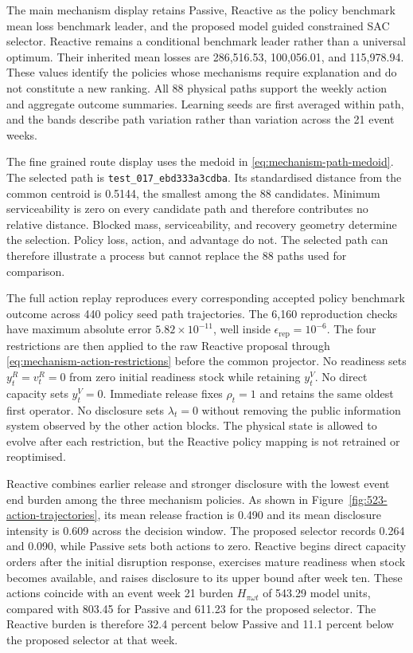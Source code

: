 \documentclass[a4paper,fleqn]{cas-sc}
\begin{document}
The main mechanism display retains Passive, Reactive as the policy benchmark mean
loss benchmark leader, and the proposed model guided constrained SAC selector.
Reactive remains a conditional benchmark leader rather than a universal
optimum. Their inherited mean losses are 286,516.53, 100,056.01, and
115,978.94. These values identify the policies whose mechanisms require
explanation and do not constitute a new ranking. All 88 physical paths support
the weekly action and aggregate outcome summaries. Learning seeds are first
averaged within path, and the bands describe path variation rather than
variation across the 21 event weeks.

The fine grained route display uses the medoid in
\cref{eq:mechanism-path-medoid}. The selected path is
\texttt{test\_017\_ebd333a3cdba}. Its standardised distance from the common
centroid is 0.5144, the smallest among the 88 candidates. Minimum serviceability
is zero on every candidate path and therefore contributes no relative
distance. Blocked mass, serviceability, and recovery geometry determine the
selection. Policy loss, action, and advantage do not. The selected path can
therefore illustrate a process but cannot replace the 88 paths used for
comparison.

The full action replay reproduces every corresponding accepted policy benchmark
outcome across 440 policy seed path trajectories. The 6,160 reproduction checks
have maximum absolute error $5.82\times10^{-11}$, well inside
$\epsilon_{\mathrm{rep}}=10^{-6}$. The four restrictions are then applied to
the raw Reactive proposal through \cref{eq:mechanism-action-restrictions}
before the common projector. No readiness sets $y_t^R=v_t^R=0$ from zero
initial readiness stock while retaining $y_t^V$. No direct capacity sets
$y_t^V=0$. Immediate release fixes $\rho_t=1$ and retains the same oldest first
operator. No disclosure sets $\lambda_t=0$ without removing the public
information system observed by the other action blocks. The physical state is
allowed to evolve after each restriction, but the Reactive policy mapping is
not retrained or reoptimised.

Reactive combines earlier release and stronger disclosure with the lowest
event end burden among the three mechanism policies. As shown in
Figure~\ref{fig:523-action-trajectories}, its mean release fraction is 0.490 and
its mean disclosure intensity is 0.609 across the decision window. The proposed
selector records 0.264 and 0.090, while Passive sets both actions to zero.
Reactive begins direct capacity orders after the initial disruption response,
exercises mature readiness when stock becomes available, and raises disclosure
to its upper bound after week ten. These actions coincide with an event week 21
burden $H_{\pi\omega t}$ of 543.29 model units, compared with 803.45 for Passive
and 611.23 for the proposed selector. The Reactive burden is therefore 32.4
percent below Passive and 11.1 percent below the proposed selector at that week.
\end{document}
